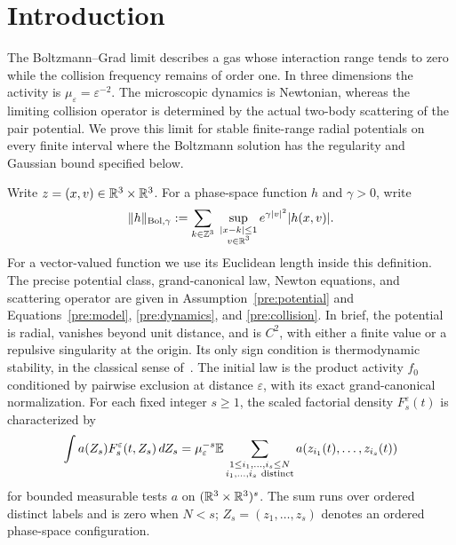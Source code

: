 \section{Introduction}
\label{sec:introduction}

The Boltzmann--Grad limit describes a gas whose interaction range tends
to zero while the collision frequency remains of order one. In three
dimensions the activity is $\mu_\varepsilon=\varepsilon^{-2}$.
The microscopic dynamics is Newtonian, whereas the limiting collision
operator is determined by the actual two-body scattering of the pair
potential. We prove this limit for stable finite-range radial potentials
on every finite interval where the Boltzmann solution has the regularity
and Gaussian bound specified below.

Write $z=(x,v)\in\mathbb R^3\times\mathbb R^3$.
For a phase-space function $h$ and $\gamma>0$, write
\begin{equation}\label{intro:norm}
 \|h\|_{\mathrm{Bol},\gamma}
 :=\sum_{k\in\mathbb Z^3}\;
 \sup_{\substack{|x-k|\le1\\v\in\mathbb R^3}}
 e^{\gamma|v|^2}|h(x,v)|.
\end{equation}
For a vector-valued function we use its Euclidean length inside this
definition. The precise potential class, grand-canonical law, Newton
equations, and scattering operator are given in
Assumption~\ref{pre:potential} and Equations~\eqref{pre:model},
\eqref{pre:dynamics}, and \eqref{pre:collision}.
In brief, the potential is radial,
vanishes beyond unit distance, and is $C^2$, with either a finite value
or a repulsive singularity at the origin. Its only sign condition is
thermodynamic stability, in the classical sense of~\cite{Ruelle69}.
The initial law is the product activity $f_0$
conditioned by pairwise exclusion at distance $\varepsilon$, with its
exact grand-canonical normalization.
For each fixed integer $s\ge1$, the scaled factorial density
$F_s^\varepsilon(t)$ is characterized by
\begin{equation}\label{intro:factorial-test}
 \int a(Z_s)F_s^\varepsilon(t,Z_s)\,dZ_s
 =\mu_\varepsilon^{-s}\mathbb E
   \sum_{\substack{1\le i_1,\ldots,i_s\le N\\
                    i_1,\ldots,i_s\ \mathrm{distinct}}}
   a(z_{i_1}(t),\ldots,z_{i_s}(t))
\end{equation}
for bounded measurable tests $a$ on $(\mathbb R^3\times\mathbb R^3)^s$.
The sum runs over ordered distinct labels and is zero when $N<s$;
$Z_s=(z_1,\ldots,z_s)$ denotes an ordered phase-space configuration.

